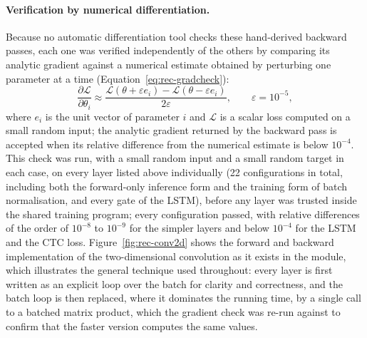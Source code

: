 \paragraph{Verification by numerical differentiation.}
Because no automatic differentiation tool checks these hand-derived backward passes, each one was verified independently of the others by comparing its analytic gradient against a numerical estimate obtained by perturbing one parameter at a time (Equation~\ref{eq:rec-gradcheck}):
\begin{equation}
\frac{\partial\mathcal L}{\partial\theta_i}\approx\frac{\mathcal L(\theta+\varepsilon e_i)-\mathcal L(\theta-\varepsilon e_i)}{2\varepsilon},\qquad\varepsilon=10^{-5},
\label{eq:rec-gradcheck}
\end{equation}
where $e_i$ is the unit vector of parameter $i$ and $\mathcal L$ is a scalar loss computed on a small random input; the analytic gradient returned by the backward pass is accepted when its relative difference from the numerical estimate is below $10^{-4}$.
This check was run, with a small random input and a small random target in each case, on every layer listed above individually (22 configurations in total, including both the forward-only inference form and the training form of batch normalisation, and every gate of the LSTM), before any layer was trusted inside the shared training program; every configuration passed, with relative differences of the order of $10^{-8}$ to $10^{-9}$ for the simpler layers and below $10^{-4}$ for the LSTM and the CTC loss.
Figure~\ref{fig:rec-conv2d} shows the forward and backward implementation of the two-dimensional convolution as it exists in the module, which illustrates the general technique used throughout: every layer is first written as an explicit loop over the batch for clarity and correctness, and the batch loop is then replaced, where it dominates the running time, by a single call to a batched matrix product, which the gradient check was re-run against to confirm that the faster version computes the same values.

